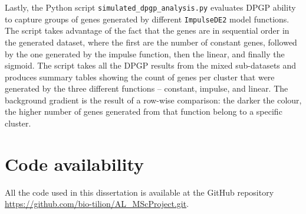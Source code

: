Lastly, the Python script \texttt{simulated\_dpgp\_analysis.py} evaluates DPGP ability to capture groups of genes generated by different \texttt{ImpulseDE2} model functions. The script takes advantage of the fact that the genes are in sequential order in the generated dataset, where the first are the number of constant genes, followed by the one generated by the impulse function, then the linear, and finally the sigmoid. The script takes all the DPGP results from the mixed sub-datasets and produces summary tables showing the count of genes per cluster that were generated by the three different functions -- constant, impulse, and linear. The background gradient is the result of a row-wise comparison: the darker the colour, the higher number of genes generated from that function belong to a specific cluster.

\section{Code availability}\label{code}
All the code used in this dissertation is available at the GitHub repository \url{https://github.com/bio-tilion/AL_MScProject.git}.
